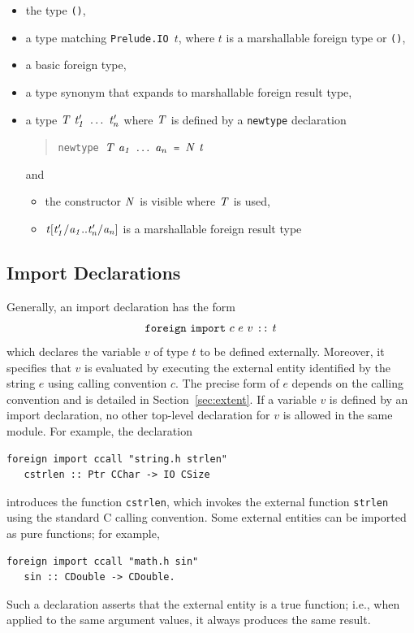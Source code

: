 \begin{itemize}
\item the type \mbox{\tt ()},
\item a type matching \mbox{\tt Prelude.IO\ }$t$, where $t$ is a marshallable foreign type or \mbox{\tt ()},
\item a basic foreign type,
\item a type synonym that expands to marshallable foreign result type,
\item a type \mbox{$\it T\ t'_1\ \ldots \ t'_n$} where \mbox{$\it T$} is defined by a \mbox{\tt newtype} declaration

\begin{quote}
\mbox{\tt newtype\ }\mbox{$\it T\ a_1\ \ldots \ a_n$}\mbox{\tt \ =\ }\mbox{$\it N\ t$}
\end{quote}

and

\begin{itemize}
\item the constructor \mbox{$\it N$} is visible where \mbox{$\it T$} is used,

\item \mbox{$\it t[t'_1/a_1..t'_n/a_n]$} is a marshallable foreign result type
\end{itemize}
\end{itemize}

\subsection{Import Declarations}
\label{sec:import}

Generally, an import declaration has the form
%
\[
\mbox{\tt foreign}~\mbox{\tt import}~c~e~v~\mbox{\tt ::}~t
\]
%
which declares the variable $v$ of type $t$ to be defined externally.
Moreover, it specifies that $v$ is evaluated by executing the external entity
identified by the string $e$ using calling convention $c$.  The precise form
of $e$ depends on the calling convention and is detailed in
Section~\ref{sec:extent}.  If a variable $v$ is defined by an import
declaration, no other top-level declaration for $v$ is allowed in the same
module.  For example, the declaration
\bprog
{\small\begin{verbatim}
foreign import ccall "string.h strlen"
   cstrlen :: Ptr CChar -> IO CSize
\end{verbatim}}
\eprog
introduces the function \mbox{\tt cstrlen}, which invokes the external function
\mbox{\tt strlen} using the standard C calling convention.  Some external entities
can be imported as pure functions; for example,
\bprog
{\small\begin{verbatim}
foreign import ccall "math.h sin"
   sin :: CDouble -> CDouble.
\end{verbatim}}
\eprog
%
Such a declaration asserts that the external entity is a true function; i.e.,
when applied to the same argument values, it always produces the same result.

